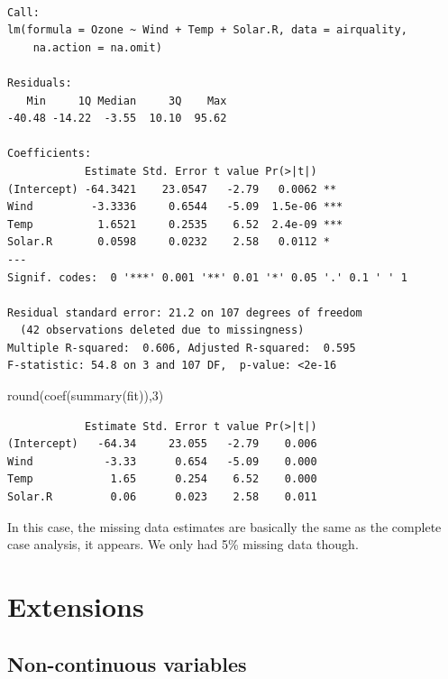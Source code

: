 \documentclass[
  letterpaper,
  DIV=11,
  numbers=noendperiod]{scrreprt}
\newenvironment{Shaded}{\begin{snugshade}}{\end{snugshade}}
\newcommand{\DecValTok}[1]{\textcolor[rgb]{0.25,0.63,0.44}{#1}}
\newcommand{\FunctionTok}[1]{\textcolor[rgb]{0.02,0.16,0.49}{#1}}
\newcommand{\NormalTok}[1]{\textcolor[rgb]{0.00,0.44,0.13}{#1}}
\begin{document}
\begin{verbatim}

Call:
lm(formula = Ozone ~ Wind + Temp + Solar.R, data = airquality, 
    na.action = na.omit)

Residuals:
   Min     1Q Median     3Q    Max 
-40.48 -14.22  -3.55  10.10  95.62 

Coefficients:
            Estimate Std. Error t value Pr(>|t|)    
(Intercept) -64.3421    23.0547   -2.79   0.0062 ** 
Wind         -3.3336     0.6544   -5.09  1.5e-06 ***
Temp          1.6521     0.2535    6.52  2.4e-09 ***
Solar.R       0.0598     0.0232    2.58   0.0112 *  
---
Signif. codes:  0 '***' 0.001 '**' 0.01 '*' 0.05 '.' 0.1 ' ' 1

Residual standard error: 21.2 on 107 degrees of freedom
  (42 observations deleted due to missingness)
Multiple R-squared:  0.606, Adjusted R-squared:  0.595 
F-statistic: 54.8 on 3 and 107 DF,  p-value: <2e-16
\end{verbatim}

\begin{Shaded}
\begin{Highlighting}[]
  \FunctionTok{round}\NormalTok{(}\FunctionTok{coef}\NormalTok{(}\FunctionTok{summary}\NormalTok{(fit)),}\DecValTok{3}\NormalTok{)}
\end{Highlighting}
\end{Shaded}

\begin{verbatim}
            Estimate Std. Error t value Pr(>|t|)
(Intercept)   -64.34     23.055   -2.79    0.006
Wind           -3.33      0.654   -5.09    0.000
Temp            1.65      0.254    6.52    0.000
Solar.R         0.06      0.023    2.58    0.011
\end{verbatim}

In this case, the missing data estimates are basically the same as the
complete case analysis, it appears. We only had 5\% missing data though.

\hypertarget{extensions}{%
\section{Extensions}\label{extensions}}

\hypertarget{non-continuous-variables}{%
\subsection{Non-continuous variables}\label{non-continuous-variables}}
\end{document}
